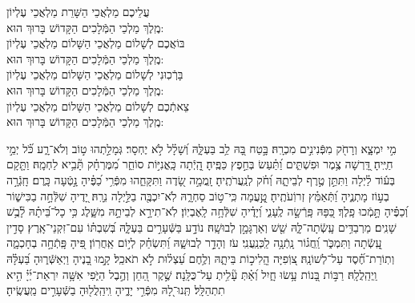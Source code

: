 \documentclass[twoside, openany, parskip=half, 11pt]{book}
\begin{document}
\birkashabonim

\medskip



 עֲלֵיכֶם מַלְאֲכֵי הַשָּׁרֵת מַלְאֲכֵי עֶלְיוֹן\\ מֶֽלֶךְ מַלְכֵי הַמְּֿלָכִים הַקָּדוֹשׁ בָּרוּךְ הוּא: \\
בּוֹאֲכֶם לְשָׁלוֹם מַלְאֲכֵי הַשָּׁלוֹם מַלְאֲכֵי עֶלְיוֹן\\ מֶֽלֶךְ מַלְכֵי הַמְּֿלָכִים הַקָּדוֹשׁ בָּרוּךְ הוּא:\\
בָּרְֿכֽוּנִי לְשָׁלוֹם מַלְאֲכֵי הַשָּׁלוֹם מַלְאֲכֵי עֶלְיוֹן \\ מֶֽלֶךְ מַלְכֵי הַמְּֿלָכִים הַקָּדוֹשׁ בָּרוּךְ הוּא:\\
צֵאתְֿכֶם לְשָׁלוֹם מַלְאֲכֵי הַשָּׁלוֹם מַלְאֲכֵי עֶלְיוֹן\\ מֶֽלֶךְ מַלְכֵי הַמְּֿלָכִים הַקָּדוֹשׁ בָּרוּךְ הוּא:

\vfill 
\clearpage 


 מִ֣י יִמְצָ֑א וְרָחֹ֖ק מִפְּֿנִינִ֣ים מִכְרָֽהּ׃ \hfill \break
בָּ֣טַח בָּ֭הּ לֵ֥ב בַּעְלָּ֑הּ וְ֝שָׁלָ֗ל לֹ֣א יֶחְסָר׃ \hfill \break
גְּמָלַ֣תְהוּ ט֣וֹב וְלֹא־רָ֑ע כֹּ֝֗ל יְמֵ֣י חַיֶּֽיהָ׃ \hfill \break
דָּֽ֭רְשָׁה צֶ֥מֶר וּפִשְׁתִּ֑ים וַ֝תַּ֗עַשׂ בְּחֵ֣פֶץ כַּפֶּֽיהָ׃ \hfill \break
הָֽ֭יְֿתָה כָּֽאֳנִיּ֣וֹת סוֹחֵ֑ר מִ֝מֶּרְחָ֗ק תָּ֘בִ֥יא לַחְמָֽהּ׃ \hfill \break
וַתָּ֤קָם בְּע֬וֹד לַ֗יְלָה וַתִּתֵּ֣ן טֶ֣רֶף לְבֵיתָ֑הּ וְ֝חֹ֗ק לְנַֽעֲרֹתֶֽיהָ׃ \hfill \break
זָֽמֲמָ֣ה שָׂ֭דֶה וַתִּקָּחֵ֑הוּ מִפְּֿרִ֥י כַ֝פֶּ֗יהָ נָ֣טְֿעָה כָּֽרֶם׃ \hfill \break
חָֽגְֿרָ֣ה בְע֣וֹז מָתְנֶ֑יהָ וַ֝תְּֿאַמֵּ֗ץ זְרוֹֽעֹתֶֽיהָ׃ \hfill \break
טָֽ֣֭עֲמָה כִּֽי־ט֣וֹב סַחְרָ֑הּ לֹֽא־יִכְבֶּ֖ה בַלַּ֣יְלָה נֵרָֽהּ׃ \hfill \break
יָ֭דֶיהָ שִׁלְּֿחָ֣ה בַכִּישׁ֑וֹר וְ֝כַפֶּ֗יהָ תָּ֣מְֿכוּ פָֽלֶךְ׃ \hfill \break
כַּ֭פָּהּ פָּֽרְֿשָׂ֣ה לֶֽעָנִ֑י וְ֝יָדֶ֗יהָ שִׁלְּֿחָ֥ה לָֽאֶבְיֽוֹן׃ \hfill \break
לֹֽא־תִירָ֣א לְבֵיתָ֣הּ מִשָּׁ֑לֶג כִּ֥י כָל־בֵּ֝יתָ֗הּ לָ֘בֻ֥שׁ שָׁנִֽים׃ \hfill \break
מַרְבַדִּ֥ים עָֽשְֿׂתָה־לָּ֑הּ שֵׁ֖שׁ וְאַרְגָּמָ֣ן לְבוּשָֽׁהּ׃ \hfill \break
נוֹדָ֣ע בַּשְּֿׁעָרִ֣ים בַּעְלָּ֑הּ בְּ֝שִׁבְתּ֗וֹ עִם־זִקְנֵי־אָֽרֶץ׃ \hfill \break
סָדִ֣ין עָֽ֭שְֿׂתָה וַתִּמְכֹּ֑ר וַֽ֝חֲג֗וֹר נָֽתְֿנָ֥ה לַֽכְּנַֽעֲנִֽי׃ \hfill \break
עֹז וְהָדָ֣ר לְבוּשָׁ֑הּ וַ֝תִּשְׂחַ֗ק לְי֣וֹם אַֽחֲרֽוֹן׃ \hfill \break
פִּ֭יהָ פָּֽתְֿחָ֣ה בְחָכְמָ֑ה וְתֽוֹרַת־חֶ֝֗סֶד עַל־לְשׁוֹנָֽהּ׃ \hfill \break
צ֭וֹֽפִיָּה הֲֽלִיכ֣וֹת בֵּיתָ֑הּ וְלֶ֥חֶם עַ֝צְל֗וּת לֹ֣א תֹאכֵֽל׃ \hfill \break
קָ֣מוּ בָ֭נֶיהָ וַיְאַשְּֿׁר֑וּהָ בַּ֝עְלָּ֗הּ וַֽיְהַֽלֲלָֽהּ׃ \hfill \break
רַבּ֣וֹת בָּ֭נוֹת עָ֥שׂוּ חָ֑יִל וְ֝אַ֗תְּ עָ֘לִ֥יתְ עַל־כֻּלָּֽנָה׃ \hfill \break
שֶׁ֣קֶר הַ֭חֵן וְהֶ֣בֶל הַיֹּ֑פִי אִשָּׁ֥ה יִרְאַת־יְ֜יָ֗ הִ֣יא תִתְהַלָּֽל׃\hfill \break
תְּֽנוּ־לָ֭הּ מִפְּֿרִ֣י יָדֶ֑יהָ וִֽיהַֽלֲל֖וּהָ בַשְּֿׁעָרִ֣ים מַֽעֲשֶֽׂיהָ׃\hfill \break
\end{document}
